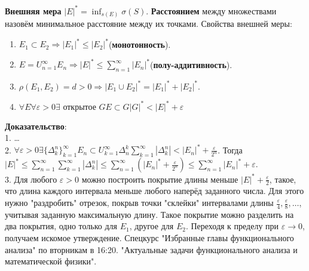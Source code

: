 \documentclass[11pt]{article}
\begin{document}
\textbf{Внешняя мера} $|E|^* = \inf_{s(E)}\sigma(S)$.
\textbf{Расстоянием} между множествами назовём минимальное расстояние между их точками.
Свойства внешней меры:
\begin{enumerate}
\item $E_1 \subset E_2 \Rightarrow |E_1|^* \leq |E_2|^*$(\textbf{монотонность}).
\item $E = U_{n = 1}^{\infty}E_n \Rightarrow |E|^* \leq \sum_{n = 1}^{\infty}|E_n|^*$(\textbf{полу-аддитивность}).
\item $\rho(E_1, E_2) = d > 0 \Rightarrow |E_1 \cup E_2|^* = |E_1|^* + |E_2|^*$.
\item $\forall E \forall\varepsilon > 0 \exists\text{ открытое }G E \subset G |G|^* < |E|^* + \varepsilon$
\end{enumerate}
\textbf{Доказательство}:\\
1. \ldots\\
2. $\forall \varepsilon > 0 \exists \{\Delta^n_k\}_{k = 1}^{\infty} E_n \subset U_{k = 1}^{\infty}\Delta_n^k \sum_{k = 1}^{\infty}|\Delta_k^n| < |E_n|^* + \frac{\varepsilon}{2^n}$.
Тогда $|E|^* \leq \sum_{n = 1}^{\infty}\sum_{k = 1}^{\infty}|\Delta_k^n| \leq \sum_{n = 1}^{\infty}\left(|E_n|^* + \frac{\varepsilon}{2^n}\right) \leq \sum_{n = 1}^{\infty}|E_n|^* + \varepsilon$.\\
3. Для любого $\varepsilon > 0$ можно построить покрытие длины меньше $|E|^* + \frac{\varepsilon}2$, такое, что длина каждого интервала
меньше любого наперёд заданного числа. Для этого нужно "раздробить" отрезок, покрыв точки "склейки" интервалами длины $\frac{\varepsilon}4, \frac{\varepsilon}8, \ldots$, учитывая
заданную максимальную длину. Такое покрытие можно разделить на два покрытия, одно только для $E_1$,
другое для $E_2$. Переходя к пределу при $\varepsilon \to 0$, получаем искомое утверждение.
Спецкурс "Избранные главы функционального анализа" по вторникам в 16:20.
"Актуальные задачи функционального анализа и математической физики".
\end{document}

